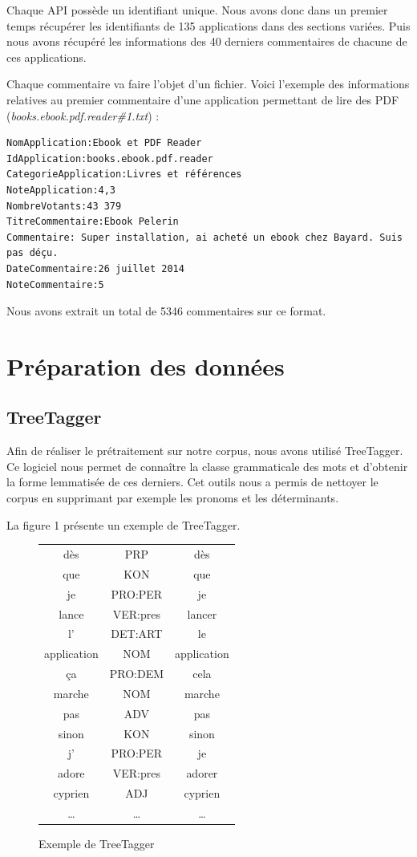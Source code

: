 \documentclass[a4paper, 11pt]{article}
\begin{document}
Chaque API possède un identifiant unique. Nous avons donc dans un premier temps récupérer les identifiants de 135 applications dans des sections variées. Puis nous avons récupéré les informations des 40 derniers commentaires de chacune de ces applications.

Chaque commentaire va faire l'objet d'un fichier. Voici l'exemple des informations relatives au premier commentaire d'une application permettant de lire des PDF (\textit{books.ebook.pdf.reader\#1.txt}) :

\begin{verbatim}
NomApplication:Ebook et PDF Reader
IdApplication:books.ebook.pdf.reader
CategorieApplication:Livres et références
NoteApplication:4,3
NombreVotants:43 379
TitreCommentaire:Ebook Pelerin
Commentaire: Super installation, ai acheté un ebook chez Bayard. Suis pas déçu.
DateCommentaire:26 juillet 2014
NoteCommentaire:5
\end{verbatim}


Nous avons extrait un total de 5346 commentaires sur ce format.

\section{Préparation des données}

\subsection{TreeTagger}
Afin de réaliser le prétraitement sur notre corpus, nous avons utilisé TreeTagger. Ce logiciel nous permet de connaître la classe grammaticale des mots et d’obtenir la forme lemmatisée de ces derniers. Cet outils nous a permis de nettoyer le corpus en supprimant par exemple les pronoms et les déterminants.

La figure 1 présente un exemple de TreeTagger.
\begin{figure}[!h]
\centering
 \begin{tabular}{|c|c|c|}
 \hline
    dès&PRP&dès\\
    que&KON&que\\
    je&PRO:PER&je\\
    lance&VER:pres&lancer\\
    l'&DET:ART&le\\
    application&NOM&application\\
    ça&PRO:DEM&cela\\
    marche&NOM&marche\\
    pas&ADV&pas\\
    sinon&KON&sinon\\
    j'&PRO:PER&je\\
    adore&VER:pres&adorer\\
    cyprien&ADJ&cyprien\\
    \dots&\dots&\dots\\
 \hline
 \end{tabular}
 \caption{Exemple de TreeTagger}
\end{figure}
\end{document}
